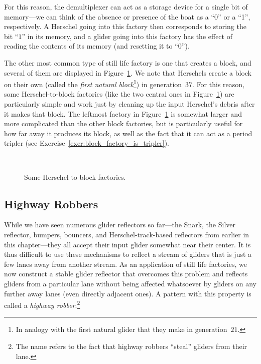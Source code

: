 For this reason, the demultiplexer can act as a storage device for a single bit of memory---we can think of the absence or presence of the boat as a ``0'' or a ``1'', respectively. A Herschel going into this factory then corresponds to storing the bit ``$1$'' in its memory, and a glider going into this factory has the effect of reading the contents of its memory (and resetting it to ``$0$'').

The other most common type of still life factory is one that creates a block, and several of them are displayed in Figure~\ref{fig:H_to_block}. We note that Herschels create a block on their own (called the \emph{first natural block}\footnote{In analogy with the first natural glider that they make in generation~$21$.}) in generation~$37$. For this reason, some Herschel-to-block factories (like the two central ones in Figure~\ref{fig:H_to_block}) are particularly simple and work just by cleaning up the input Herschel's debris after it makes that block. The leftmost factory in Figure~\ref{fig:H_to_block} is somewhat larger and more complicated than the other block factories, but is particularly useful for how far away it produces its block, as well as the fact that it can act as a period tripler (see Exercise~\ref{exer:block_factory_is_tripler}).

\begin{figure}[!htb]
	\centering
	 \quad \ \ \  \quad \ \ \  \quad \ \ \ 
	\caption{Some Herschel-to-block factories.}
	\label{fig:H_to_block}
\end{figure}


\subsection{Highway Robbers}\label{sec:highway_robber}

While we have seen numerous glider reflectors so far---the Snark, the Silver reflector, bumpers, bouncers, and Herschel-track-based reflectors from earlier in this chapter---they all accept their input glider somewhat near their center. It is thus difficult to use these mechanisms to reflect a stream of gliders that is just a few lanes away from another stream. As an application of still life factories, we now construct a stable glider reflector that overcomes this problem and reflects gliders from a particular lane without being affected whatsoever by gliders on any further away lanes (even directly adjacent ones). A pattern with this property is called a \emph{highway robber}.\footnote{The name refers to the fact that highway robbers ``steal'' gliders from their lane.}

